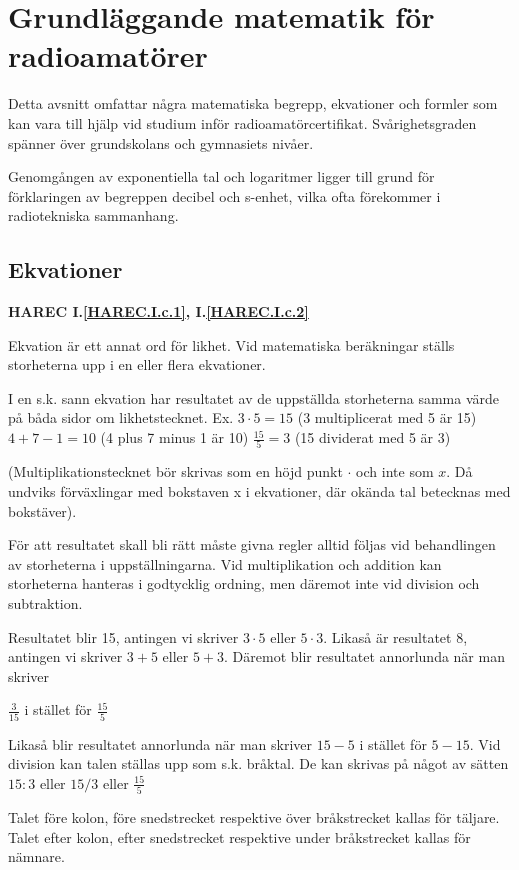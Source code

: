 \chapter{Grundläggande matematik för radioamatörer}

Detta avsnitt omfattar några matematiska begrepp, ekvationer och formler som kan
vara till hjälp vid studium inför radioamatörcertifikat. Svårighetsgraden
spänner över grundskolans och gymnasiets nivåer.

Genomgången av exponentiella tal och logaritmer ligger till grund för
förklaringen av begreppen decibel och s-enhet, vilka ofta förekommer i
radiotekniska sammanhang.

\section{Ekvationer}
\textbf{HAREC I.\ref{HAREC.I.c.1}\label{myHAREC.I.c.1}, I.\ref{HAREC.I.c.2}\label{myHAREC.I.c.2}}

Ekvation är ett annat ord för likhet. Vid matematiska beräkningar ställs
storheterna upp i en eller flera ekvationer.

I en s.k. sann ekvation har resultatet av de uppställda storheterna samma värde
på båda sidor om likhetstecknet.
Ex. \(3 \cdot 5 = 15\) (3 multiplicerat med 5 är 15)
\(4 + 7 - 1 = 10\) (4 plus 7 minus 1 är 10)
\(\frac{15}{5} = 3\) (15 dividerat med 5 är 3)

(Multiplikationstecknet bör skrivas som en höjd punkt \(\cdot\) och inte som \(x\).
Då undviks förväxlingar med bokstaven x i ekvationer, där okända tal betecknas
med bokstäver).

För att resultatet skall bli rätt måste givna regler alltid följas vid
behandlingen av storheterna i uppställningarna. Vid multiplikation och addition
kan storheterna hanteras i godtycklig ordning, men däremot inte vid division och
subtraktion.

Resultatet blir 15, antingen vi skriver \(3 \cdot 5\) eller \(5 \cdot 3\).
Likaså är resultatet 8, antingen vi skriver \(3 + 5\) eller \(5 + 3\).
Däremot blir resultatet annorlunda när man skriver

\(\frac{3}{15}\) i stället för \(\frac{15}{5}\)

Likaså blir resultatet annorlunda när man skriver \(15 - 5\) i stället för
\(5 - 15\). Vid division kan talen ställas upp som s.k. bråktal. De kan skrivas på
något av sätten \(15:3\) eller \(15/3\) eller \(\frac{15}{5}\)

Talet före kolon, före snedstrecket respektive över bråkstrecket kallas för
täljare.
Talet efter kolon, efter snedstrecket respektive under bråkstrecket kallas för
nämnare.


